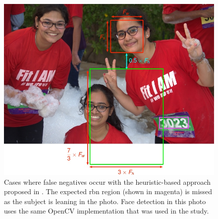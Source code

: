 \begin{figure}[p]
  \centering
  \includegraphics[width=\textwidth]{images/background/benami2012_missed}
  \caption[Drawbacks of heuristic-driven approaches for RBN detection]{Cases where false negatives occur with the heuristic-based approach proposed in \citep{Benami:2012jf}. The expected \gls{rbn} region (shown in magenta) is missed as the subject is leaning in the photo. Face detection in this photo uses the same OpenCV implementation \citep{Lienhart:2002uo} that was used in the study.}
  \label{fig:background:recognition:benami2012_missed}
\end{figure}

\clearpage